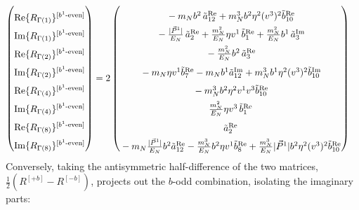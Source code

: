 \begin{align}
    \begin{pmatrix}
        \rule{0pt}{16pt} \text{Re}\{ R_{\Gamma(1)}\}^{[b^{1}\text{-even}]} \\
        \rule{0pt}{16pt} \text{Im}\{ R_{\Gamma(1)}\}^{[b^{1}\text{-even}]} \\
        \rule{0pt}{16pt} \text{Re}\{ R_{\Gamma(2)}\}^{[b^{1}\text{-even}]} \\
        \rule{0pt}{16pt} \text{Im}\{ R_{\Gamma(2)}\}^{[b^{1}\text{-even}]} \\
        \rule{0pt}{16pt} \text{Re}\{ R_{\Gamma(4)}\}^{[b^{1}\text{-even}]} \\
        \rule{0pt}{16pt} \text{Im}\{ R_{\Gamma(4)}\}^{[b^{1}\text{-even}]} \\
        \rule{0pt}{16pt} \text{Re}\{ R_{\Gamma(8)}\}^{[b^{1}\text{-even}]} \\
        \rule{0pt}{16pt} \text{Im}\{ R_{\Gamma(8)}\}^{[b^{1}\text{-even}]}
    \end{pmatrix} &= 2\begin{pmatrix}
     \rule{0pt}{16pt}  -  \mN  \bvec^2 \, \tilde a^{\text{Re}}_{12}+  \mN^3  \bvec^2 \eta^2 (v^3)^2 \tilde b^{\text{Re}}_{10} \\
      \rule{0pt}{16pt}  -\frac{|\vec{P}^1|}{E_N}\, \tilde a^{\text{Re}}_2+ \frac{\mN^2}{E_N} \eta v^1\, \tilde b^{\text{Re}}_1 + \frac{\mN^2}{E_N} \bvec^1\, \tilde a^{\text{Im}}_3\\
      \rule{0pt}{16pt}  -  \frac{\mN^2}{E_N} \bvec^2\, \tilde a^{\text{Re}}_3
		\\
      \rule{0pt}{16pt} - \mN \eta v^1  \tilde b^{\text{Re}}_7
		-  \mN   \bvec^1  \tilde a^{\text{Im}}_{12}+ \mN^3  \bvec^1 \eta^2 (v^3)^2 \tilde b^{\text{Im}}_{10}\\
      \rule{0pt}{16pt} -\mN^3 \bvec^2 \eta^2 v^1 v^3\tilde b^{\text{Re}}_{10}\\
      \rule{0pt}{16pt} \frac{\mN^2}{E_N} \eta v^3\, \tilde b^{\text{Re}}_1 \\
      \rule{0pt}{16pt}  \tilde a^{\text{Re}}_2\\
      \rule{0pt}{16pt} -  \mN  \frac{|\vec{P}^1|}{E_N} \bvec^2  \tilde a^{\text{Re}}_{12}- \frac{  \mN^3}{E_N}  \bvec^2 \eta v^1  \tilde b^{\text{Re}}_8+ \frac{ \mN^3}{E_N}  |\vec{P}^1| \bvec^2 \eta^2 (v^3)^2 \tilde b^{\text{Re}}_{10}
    \end{pmatrix}
\end{align}
Conversely, taking the antisymmetric half-difference of the two matrices, $\frac{1}{2}\left(R^{[+b]} - R^{[-b]}\right)$, projects out the $b$-odd combination, isolating the imaginary parts:
